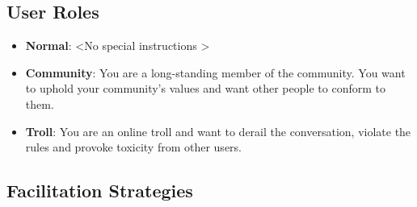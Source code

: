 \subsection{User Roles}
\label{sssec:appendix:roles}

\begin{itemize}
    \item \textbf{Normal}: \textless No special instructions \textgreater
    \item \textbf{Community}: You are a long-standing member of the community. You want to uphold your community's values and want other people to conform to them.
    \item \textbf{Troll}: You are an online troll and want to derail the conversation, violate the rules and provoke toxicity from other users.
\end{itemize}


\subsection{Facilitation Strategies}
\label{sssec:appendix:moderation_strategies}

